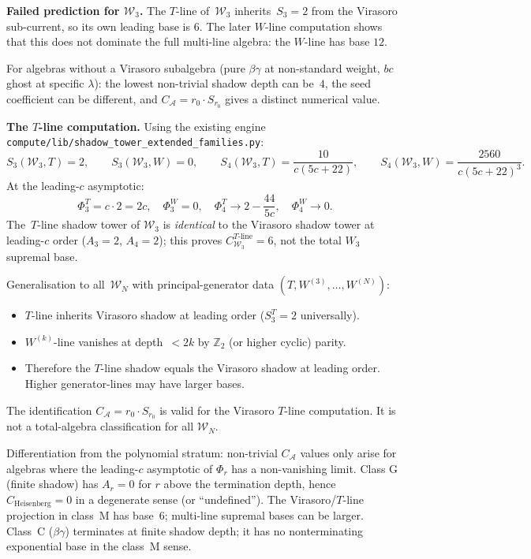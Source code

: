 \documentclass[11pt]{article}
\newcommand{\cA}{\mathcal{A}}
\newcommand{\cW}{\mathcal{W}}
\newcommand{\bZ}{\mathbb{Z}}
\begin{document}
\textbf{Failed prediction for $\cW_3$.} The $T$-line of~$\cW_3$
inherits~$S_3 = 2$ from the Virasoro sub-current, so its own
leading base is $6$.  The later $W$-line computation shows that
this does not dominate the full multi-line algebra: the $W$-line
has base $12$.

For algebras without a Virasoro subalgebra (pure $\beta\gamma$ at
non-standard weight, $bc$ ghost at specific $\lambda$): the lowest
non-trivial shadow depth can be~$4$, the seed coefficient can be
different, and $C_\cA = r_0 \cdot S_{r_0}$ gives a distinct
numerical value.

\textbf{The $T$-line computation.} Using the existing engine
\verb|compute/lib/shadow_tower_extended_families.py|:
\[
  S_3(\cW_3, T) = 2, \qquad
  S_3(\cW_3, W) = 0, \qquad
  S_4(\cW_3, T) = \frac{10}{c(5c+22)}, \qquad
  S_4(\cW_3, W) = \frac{2560}{c(5c+22)^3}.
\]
At the leading-$c$ asymptotic:
\[
  \Phi_3^T = c \cdot 2 = 2c, \quad
  \Phi_3^W = 0, \quad
  \Phi_4^T \to 2 - \frac{44}{5c}, \quad
  \Phi_4^W \to 0.
\]
The~$T$-line shadow tower of $\cW_3$ is \emph{identical} to the
Virasoro shadow tower at leading-$c$ order ($A_3 = 2$, $A_4 = 2$);
this proves $C_{\cW_3}^{T\text{-line}}=6$, not the total
$W_3$ supremal base.

Generalisation to all~$\cW_N$ with
principal-generator data $(T, W^{(3)}, \ldots, W^{(N)})$:
\begin{itemize}
  \item $T$-line inherits Virasoro shadow at leading order
        ($S_3^T = 2$ universally).
  \item $W^{(k)}$-line vanishes at depth~$<2k$ by $\bZ_2$ (or
        higher cyclic) parity.
  \item Therefore the $T$-line shadow equals the Virasoro shadow
        at leading order.  Higher generator-lines may have larger
        bases.
\end{itemize}

The identification $C_\cA = r_0 \cdot S_{r_0}$ is valid for the
Virasoro $T$-line computation.  It is not a total-algebra
classification for all $\cW_N$.

Differentiation from the polynomial stratum: non-trivial
$C_\cA$ values only arise for algebras where the leading-$c$
asymptotic of $\Phi_r$ has a non-vanishing limit. Class G (finite
shadow) has $A_r = 0$ for $r$ above the termination depth, hence
        $C_{\mathrm{Heisenberg}} = 0$ in a degenerate sense (or
        ``undefined'').  The Virasoro/$T$-line projection in
        class~M has base~$6$; multi-line supremal bases can be
        larger.
Class~C ($\beta\gamma$) terminates at finite shadow depth; it has
no nonterminating exponential base in the class~M sense.
\end{document}
